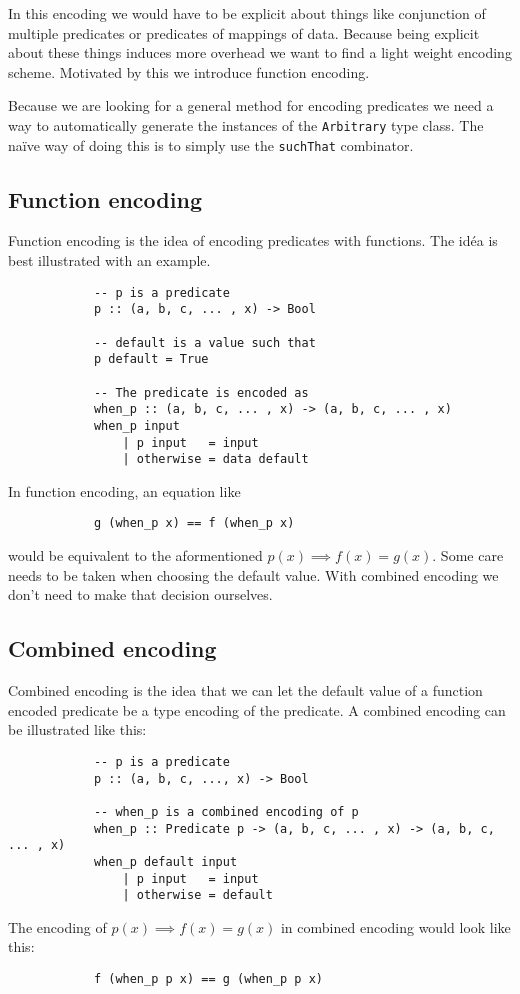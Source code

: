         In this encoding we would have to be explicit about things like conjunction
        of multiple predicates or predicates of mappings of data.
        Because being explicit about these things induces more overhead
        we want to find a light weight encoding scheme. Motivated by this
        we introduce function encoding.

        Because we are looking for a general method for encoding predicates we need
        a way to automatically generate the instances of the \texttt{Arbitrary} type class.
        The naïve way of doing this is to simply use the \texttt{suchThat}%
        combinator. 

    \subsection{Function encoding}

        Function encoding is the idea of encoding 
        predicates with functions. The idéa is best
        illustrated with an example.
        \begin{verbatim}
            -- p is a predicate
            p :: (a, b, c, ... , x) -> Bool

            -- default is a value such that
            p default = True

            -- The predicate is encoded as
            when_p :: (a, b, c, ... , x) -> (a, b, c, ... , x)
            when_p input
                | p input   = input
                | otherwise = data default
        \end{verbatim}
        In function encoding, an equation like
        \begin{verbatim}
            g (when_p x) == f (when_p x)
        \end{verbatim}
        would be equivalent to the aformentioned $p(x) \implies f(x) = g(x)$.
        Some care needs to be taken when choosing the default value.
        With combined encoding we don't need to make that decision ourselves.

     \subsection{Combined encoding}\label{combined_encoding}
        
        Combined encoding is the idea that we can let the
        default value of a function encoded predicate be a type
        encoding of the predicate. A combined encoding can be illustrated
        like this:
        \begin{verbatim}
            -- p is a predicate
            p :: (a, b, c, ..., x) -> Bool  

            -- when_p is a combined encoding of p
            when_p :: Predicate p -> (a, b, c, ... , x) -> (a, b, c, ... , x)
            when_p default input
                | p input   = input
                | otherwise = default
        \end{verbatim}
        The encoding of $p(x) \implies f(x) = g(x)$ in combined encoding would look like
        this:
        \begin{verbatim}
            f (when_p p x) == g (when_p p x)
        \end{verbatim}
